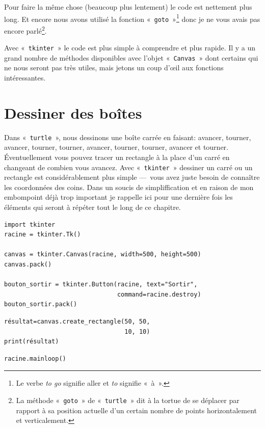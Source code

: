Pour faire la même chose (beaucoup plus lentement) le code est nettement plus long. Et encore nous avons utilisé la fonction «~\texttt{goto}~»\footnote{Le verbe \emph{to go} signifie aller et \emph{to} signifie «~à~».} donc je ne vous avais pas encore parlé\footnote{La méthode «~\texttt{goto}~» de «~\texttt{turtle}~» dit à la tortue de se déplacer par rapport à sa position actuelle d'un certain nombre de points horizontalement et verticalement.}. 

Avec «~\texttt{tkinter}~» le code est plus simple à comprendre et plus rapide. Il y a un grand nombre de méthodes disponibles avec l'objet «~\texttt{Canvas}~» dont certains qui ne nous seront pas très utiles, mais jetons un coup d'œil aux fonctions intéressantes.

\section{Dessiner des boîtes}

Dans «~\texttt{turtle}~», nous dessinons une boîte carrée en faisant: avancer, tourner, avancer, tourner, tourner, avancer, tourner, tourner, avancer et tourner. Éventuellement vous pouvez tracer un rectangle à la place d'un carré en changeant de combien vous avancez. Avec «~\texttt{tkinter}~» dessiner un carré ou un rectangle est considérablement plus simple ---~vous avez juste besoin de connaître les coordonnées des coins.
Dans un soucis de simpliffication et en raison de mon embompoint déjà trop important je rappelle ici pour une dernière fois les éléments qui seront à répéter tout le long de ce chapitre.

\begin{Verbatim}[frame=single,rulecolor=\color{mbleu}, label=à taper (ne sera plus indiqué par la suite)]
import tkinter
racine = tkinter.Tk()

canvas = tkinter.Canvas(racine, width=500, height=500)
canvas.pack()

bouton_sortir = tkinter.Button(racine, text="Sortir",
                               command=racine.destroy)
bouton_sortir.pack()
\end{Verbatim}

\begin{Verbatim}[frame=single,rulecolor=\color{mbleu}, label=à taper]
résultat=canvas.create_rectangle(50, 50, 
                                 10, 10)
print(résultat)
\end{Verbatim}

\begin{Verbatim}[frame=single,rulecolor=\color{mbleu}, label=à taper (ne sera plus indiqué par la suite)]
racine.mainloop()
\end{Verbatim}

